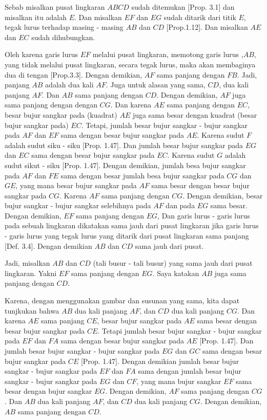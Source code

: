 \documentclass[a4paper]{book}
\begin{document}
Sebab misalkan pusat lingkaran $ABCD$ sudah ditemukan [Prop. 3.1] dan misalkan
itu adalah $E$. Dan misalkan $EF$ dan $EG$ sudah ditarik dari titik $E$, tegak
lurus terhadap masing - masing $AB$ dan $CD$ [Prop.1.12]. Dan misalkan $AE$ dan
$EC$ sudah dihubungkan.

Oleh karena garis lurus $EF$ melalui pusat lingkaran, memotong garis lurus 
,$AB$,  yang tidak melalui pusat lingkaran, secara tegak lurus, maka akan 
membaginya dua di tengan [Prop.3.3]. Dengan demikian, $AF$ sama panjang dengan
$FB$. Jadi, panjang $AB$ adalah dua kali $AF$. Juga untuk alasan yang sama, 
$CD$, dua kali panjang $AF$. Dan $AB$ sama panjang dengan $CD$. Dengan demikian,
$AF$ juga sama panjang dengan dengan $CG$. Dan karena $AE$ sama panjang dengan
$EC$, besar bujur sangkar pada (kuadrat) $AE$ juga sama besar dengan kuadrat 
(besar bujur sangkar pada) $EC$. Tetapi, jumlah besar bujur sangkar - bujur 
sangkar pada $AF$ dan $EF$ sama dengan besar bujur sangkar pada $AE$. Karena
sudut $F$ adalah sudut siku - siku [Prop. 1.47]. Dan jumlah besar bujur sangkar
pada $EG$ dan $EC$ sama dengan besar bujur sangkar pada $EC$. Karena sudut $G$
adalah sudut sikut - siku [Prop. 1.47]. Dengan demikian, jumlah besa bujur 
sangkar pada $AF$ dan $FE$ sama dengan besar jumlah besa bujur sangkar pada
$CG$ dan $GE$, yang mana besar bujur sangkar pada $AF$ sama besar dengan besar
bujur sangkar pada $CG$. Karena $AF$ sama panjang dengan $CG$. Dengan demikian, 
besar bujur sangkar - bujur sangkar selebihnya pada $AF$ dan pada $EG$ sama
besar. Dengan demikian, $EF$ sama panjang dengan $EG$, Dan garis lurus - garis
lurus pada sebuah lingkaran dikatakan sama jauh dari pusat lingkaran jika garis
lurus - garis lurus yang tegak lurus yang ditarik dari pusat lingkaran sama 
panjang [Def. 3.4]. Dengan demikian $AB$ dan $CD$ sama jauh dari pusat.

Jadi, misalkan $AB$ dan $CD$ (tali busur - tali busur) yang sama jauh dari pusat 
lingkaran. Yakni $EF$ sama panjang dengan $EG$. Saya katakan $AB$ juga sama 
panjang dengan $CD$.

Karena, dengan menggunakan gambar dan susunan yang sama, kita dapat tunjkukan
bahwa $AB$ dua kali panjang $AF$, dan $CD$ dua kali panjang $CG$. Dan karena
$AE$ sama panjang $CE$, besar bujur sangkar pada $AE$ sama besar dengan besar
bujur sangkar pada $CE$. Tetapi jumlah besar bujur sangkar - bujur sangkar pada
$EF$ dan $FA$ sama dengan besar bujur sangkar pada $AE$ [Prop. 1.47]. Dan jumlah
besar bujur sangkar - bujur sangkar pada $EG$ dan $GC$ sama dengan besar bujur
sangkar pada $CE$ [Prop. 1.47]. Dengan demikian jumlah besar bujur sangkar - 
bujur sangkar pada $EF$ dan $FA$ sama dengan jumlah besar bujur sangkar - bujur
sangkar pada $EG$ dan $CF$, yang mana bujur sangkar $EF$ sama besar dengan bujur
sangkar $EG$. Dengan demikian, $AF$ sama panjang dengan $CG$. Dan $AB$ dua kali
panjang $AF$, dan $CD$ dua kali panjang $CG$. Dengan demikian, $AB$ sama panjang
dengan $CD$.
\end{document}
